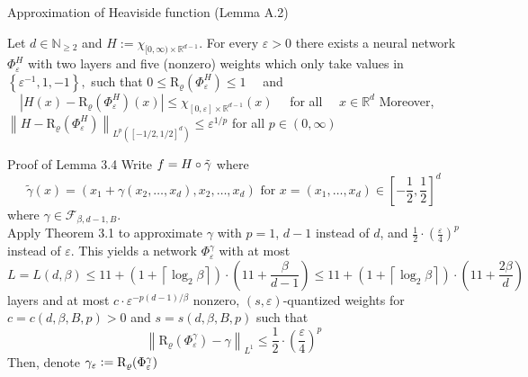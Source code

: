 \documentclass{if-beamer}
\newcommand{\defeq}{\vcentcolon=}
\newcommand{\norm}[2]{\left\lVert#1\right\rVert_{#2}}
\begin{document}
\begin{frame}{Approximation of Heaviside function (Lemma A.2)}
    \begin{tcolorbox}
        Let $d \in \mathbb{N}_{\geq 2}$ and $H:=\chi_{[0, \infty) \times \mathbb{R}^{d-1}}$. For every $\varepsilon>0$ there exists a neural network $\Phi_{\varepsilon}^{H}$ with two layers and five (nonzero) weights which only take values in $\left\{\varepsilon^{-1}, 1,-1\right\},$ such that $0 \leq \mathrm{R}_{\varrho}\left(\Phi_{\varepsilon}^{H}\right) \leq 1 \quad$ and $\quad\left|H(x)-\mathrm{R}_{\varrho}\left(\Phi_{\varepsilon}^{H}\right)(x)\right| \leq \chi_{[0, \varepsilon] \times \mathbb{R}^{d-1}}(x) \quad$ for all $\quad x \in \mathbb{R}^{d}$ Moreover, $\left\|H-\mathrm{R}_{\varrho}\left(\Phi_{\varepsilon}^{H}\right)\right\|_{L^{p}\left([-1 / 2,1 / 2]^{d}\right)} \leq \varepsilon^{1 / p}$ for all $p \in(0, \infty)$
    \end{tcolorbox}
\end{frame}

\begin{frame}{Proof of Lemma 3.4}
    Write $f=H \circ \Tilde{\gamma}$ where 
    {\small
    $$\widetilde{\gamma}(x)=\left(x_{1}+\gamma\left(x_{2}, \ldots, x_{d}\right), x_{2}, \ldots, x_{d}\right) \text { for } x=\left(x_{1}, \ldots, x_{d}\right) \in\left[-\frac{1}{2},\frac{1}{2}\right]^{d} $$
    }%
    where $\gamma \in \mathcal{F}_{\beta, d-1,   B}$.  \\
    Apply Theorem 3.1 to approximate $\gamma$ with $p=1$, $d-1$ instead of $d$, and $\frac{1}{2}\cdot \left(\frac{\varepsilon}{4}\right)^p$ instead of $\varepsilon$. This yields a network $\Phi_{\varepsilon}^{\gamma}$ with at most 
    {\small $$L=L(d,\beta) \leq 11+ \left(1+\left\lceil\log _{2} \beta\right\rceil\right) \cdot(11+\frac{\beta}{d-1}) \leq 11+\left(1+\left\lceil\log _{2} \beta\right\rceil\right) \cdot(11+\frac{2\beta}{d})$$ }
    layers and at most $c \cdot \varepsilon^{-p(d-1)/\beta}$ nonzero, $(s, \varepsilon)$-quantized weights for $c = c(d,\beta,B,p) >0$ and $s=s(d, \beta, B, p)$ such that
    $$ \norm{\mathrm{R}_{\varrho}(\Phi_{\varepsilon}^{\gamma}) - \gamma}{L^1} \leq \frac{1}{2}\cdot \left(\frac{\varepsilon}{4} \right)^p
    $$
    Then, denote $\gamma_{\varepsilon} \defeq \mathrm{R}_{\varrho}(\Phi_{\varepsilon}^{\gamma})$
\end{frame}
\end{document}
